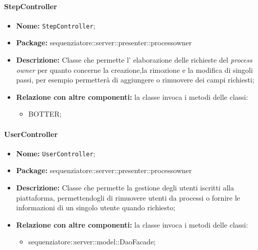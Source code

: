 \paragraph{StepController}
	\begin{itemize}
		\item \textbf{Nome:} \texttt{StepController};
		\item \textbf{Package:} sequenziatore::server::presenter::processowner
		\item \textbf{Descrizione:} Classe che permette l' elaborazione delle richieste del \textit{process owner} per quanto concerne la creazione,la rimozione e la modifica di singoli passi, per esempio permetterà di aggiungere o rimuovere dei campi richiesti;
		\item \textbf{Relazione con altre componenti:} la classe invoca i metodi delle classi:
		\begin{itemize}
			\item BOTTER;
		\end{itemize}
	\end{itemize}
\paragraph{UserController}
	\begin{itemize}
		\item \textbf{Nome:} \texttt{UserController};
		\item \textbf{Package:} sequenziatore::server::presenter::processowner
		\item \textbf{Descrizione:} Classe che permette la gestione degli utenti iscritti alla piattaforma, permettendogli di rimuovere utenti da processi o fornire le informazioni di un singolo utente quando richiesto;
		\item \textbf{Relazione con altre componenti:} la classe invoca i metodi delle classi:
		\begin{itemize}
			\item sequenziatore::server::model::DaoFacade;
		\end{itemize}
	\end{itemize}

